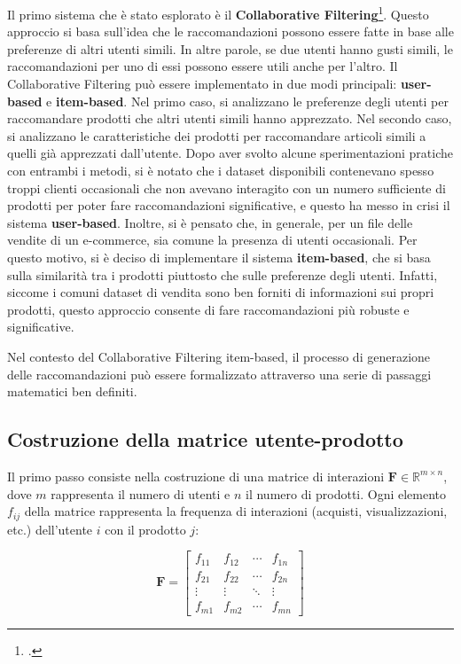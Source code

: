 Il primo sistema che è stato esplorato è il \textbf{Collaborative Filtering}\footcite{site:collaborative-filtering}. Questo approccio si basa sull'idea che le raccomandazioni possono essere fatte in base alle preferenze di altri utenti simili. In altre parole, se due utenti hanno gusti simili, le raccomandazioni per uno di essi possono essere utili anche per l'altro. Il Collaborative Filtering può essere implementato in due modi principali: \textbf{user-based} e \textbf{item-based}. Nel primo caso, si analizzano le preferenze degli utenti per raccomandare prodotti che altri utenti simili hanno apprezzato. Nel secondo caso, si analizzano le caratteristiche dei prodotti per raccomandare articoli simili a quelli già apprezzati dall'utente. Dopo aver svolto alcune sperimentazioni pratiche con entrambi i metodi, si è notato che i dataset disponibili contenevano spesso troppi clienti occasionali che non avevano interagito con un numero sufficiente di prodotti per poter fare raccomandazioni significative, e questo ha messo in crisi il sistema \textbf{user-based}. Inoltre, si è pensato che, in generale, per un file delle vendite di un e-commerce, sia comune la presenza di utenti occasionali. Per questo motivo, si è deciso di implementare il sistema \textbf{item-based}, che si basa sulla similarità tra i prodotti piuttosto che sulle preferenze degli utenti. Infatti, siccome i comuni dataset di vendita sono ben forniti di informazioni sui propri prodotti, questo approccio consente di fare raccomandazioni più robuste e significative.

Nel contesto del Collaborative Filtering item-based, il processo di generazione delle raccomandazioni può essere formalizzato attraverso una serie di passaggi matematici ben definiti.

\subsection{Costruzione della matrice utente-prodotto}
\label{sec:collaborative-filtering-matrice-utenti-prodotti}

Il primo passo consiste nella costruzione di una matrice di interazioni $\mathbf{F} \in \mathbb{R}^{m \times n}$, dove $m$ rappresenta il numero di utenti e $n$ il numero di prodotti. Ogni elemento $f_{ij}$ della matrice rappresenta la frequenza di interazioni (acquisti, visualizzazioni, etc.) dell'utente $i$ con il prodotto $j$:

\begin{equation}
\mathbf{F} = \begin{bmatrix}
f_{11} & f_{12} & \cdots & f_{1n} \\
f_{21} & f_{22} & \cdots & f_{2n} \\
\vdots & \vdots & \ddots & \vdots \\
f_{m1} & f_{m2} & \cdots & f_{mn}
\end{bmatrix}
\end{equation}

